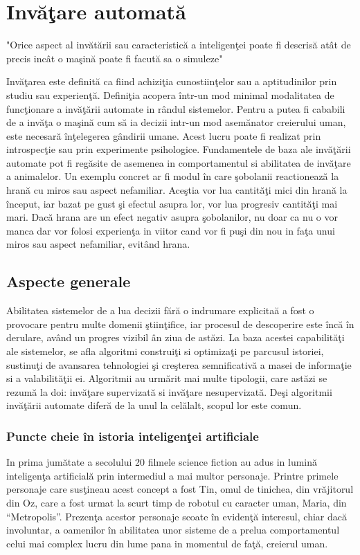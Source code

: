 
	
	\chapter{Invăţare automată}
	
		\begin{center}
		"Orice aspect al invătării sau caracteristică a inteligenţei poate fi descrisă atât de precis incât o maşină poate fi facută sa o simuleze"\cite{mccarthy_proposal} 
		\end{center}
	
	Invăţarea este definită ca fiind achiziţia cunostiinţelor sau a aptitudinilor prin studiu sau experienţă. Definiţia acopera într-un mod minimal modalitatea de funcţionare a invăţării automate in rândul sistemelor. Pentru a putea fi cababili de a invăţa o maşină cum să ia decizii intr-un mod asemănator creierului uman, este necesară înţelegerea gândirii umane. Acest lucru poate fi realizat prin introspecţie sau prin experimente psihologice.  
	Fundamentele de baza ale invăţării automate pot fi regăsite de asemenea in comportamentul si abilitatea de invăţare a animalelor. Un exemplu concret ar fi modul în care şobolanii reactionează la hrană cu miros sau aspect nefamiliar. Aceştia vor lua cantităţi mici din hrană la început, iar bazat pe gust şi efectul asupra lor, vor lua progresiv cantităţi mai mari. Dacă hrana are un efect negativ asupra şobolanilor, nu doar ca nu o vor manca dar vor folosi experienţa in viitor cand vor fi puşi din nou in faţa unui miros sau aspect nefamiliar, evitând hrana. 
	
	\section{Aspecte generale}
	Abilitatea sistemelor de a lua decizii fără o indrumare explicitaă a fost o provocare pentru multe domenii ştiinţifice, iar procesul de descoperire este încă în derulare, având un progres vizibil ân ziua de astăzi. La baza acestei capabilităţi ale sistemelor, se afla algoritmi construiţi si optimizaţi pe parcusul istoriei, sustinuţi de avansarea tehnologiei şi creşterea semnificativă a masei de informaţie si a valabilităţii ei. 
	Algoritmii au urmărit mai multe tipologii, care astăzi se rezumă la doi: invăţare supervizată si invăţare nesupervizată. Deşi algoritmii invăţării automate diferă de la unul la celălalt, scopul lor este comun.
	
	\subsection{Puncte cheie în istoria inteligenţei artificiale}
	In prima jumătate a secolului 20 filmele science fiction au adus in lumină inteligenţa artificială prin intermediul a mai multor personaje. Printre primele personaje care susţineau acest concept a fost Tin, omul de tinichea, din vrăjitorul din Oz, care a fost urmat la scurt timp de robotul cu caracter uman, Maria, din “Metropolis”. Prezenţa acestor personaje scoate în evidenţă interesul, chiar dacă involuntar, a oamenilor în abilitatea unor sisteme de a prelua comportamentul celui mai complex lucru din lume pana in momentul de faţă, creierul uman. 
	

